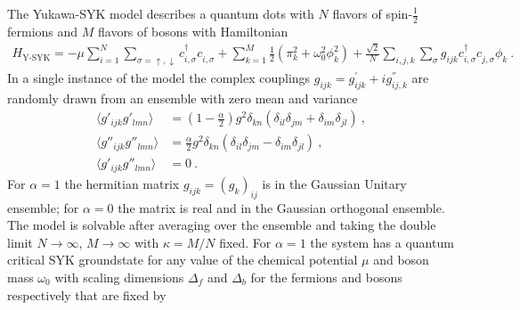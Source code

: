 \noindent
The Yukawa-SYK model describes a quantum dots with $N$ flavors of spin-$\frac{1}{2}$ fermions and $M$ flavors of bosons with Hamiltonian \cite{esterlis2019cooper}
\begin{align}
       H_{\text{Y-SYK}} = -\mu\sum_{i=1}^N\sum_{\sigma=\uparrow,\downarrow} c^\dagger_{i,\sigma} c^{\phantom{\dagger}}_{i, \sigma} + \sum_{k=1}^M \frac{1}{2}\left(\pi_k^2 + \omega_0^2\phi_k^2\right) + \frac{\sqrt{2}}{N}\sum_{i,j,k}\sum_{\sigma}g_{ijk} c^\dagger_{i,\sigma} c^{\phantom{\dagger}}_{j,\sigma} \phi^{\phantom{\dagger}}_k~.
    \label{eq:HYSYK}
\end{align}
In a single instance of the model the complex couplings $g_{ijk}=g^{'}_{ijk}+ig^{''}_{ij,k}$ are randomly drawn from an ensemble with zero mean and variance
\begin{align}
    \langle g'_{ijk}g'_{lmn}\rangle &= (1-\frac{\alpha}{2})g^2\delta_{kn}(\delta_{il}\delta_{jm}+\delta_{im}\delta_{jl})~,\nonumber\\
    \langle g''_{ijk}g''_{lmn}\rangle &= \frac{\alpha}{2}g^2\delta_{kn}(\delta_{il}\delta_{jm}-\delta_{im}\delta_{jl})~,\nonumber\\
    \langle g'_{ijk}g''_{lmn}\rangle &=0~.
\end{align}
For $\alpha=1$ the hermitian matrix $g_{ijk}=(g_k)_{ij}$ is in the Gaussian Unitary ensemble; for $\alpha=0$ the matrix is real and in the Gaussian orthogonal ensemble. The model is solvable after averaging over the ensemble and taking the double limit $N\rightarrow \infty$, $M\rightarrow\infty$ with $\kappa=M/N$ fixed.
For $\alpha=1$ the system has a quantum critical SYK groundstate for any value of the chemical potential $\mu$ and boson mass $\omega_0$ with scaling dimensions $\Delta_f$ and $\Delta_b$ for the fermions and bosons respectively that are fixed by 
